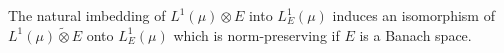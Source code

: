 The natural imbedding of $L^1(\mu) \otimes E$ into $L^1_E(\mu)$ induces an isomorphism of $L^1(\mu) \tilde{\otimes} E$ onto $L^1_E(\mu)$ which is norm-preserving if $E$ is a Banach space.
